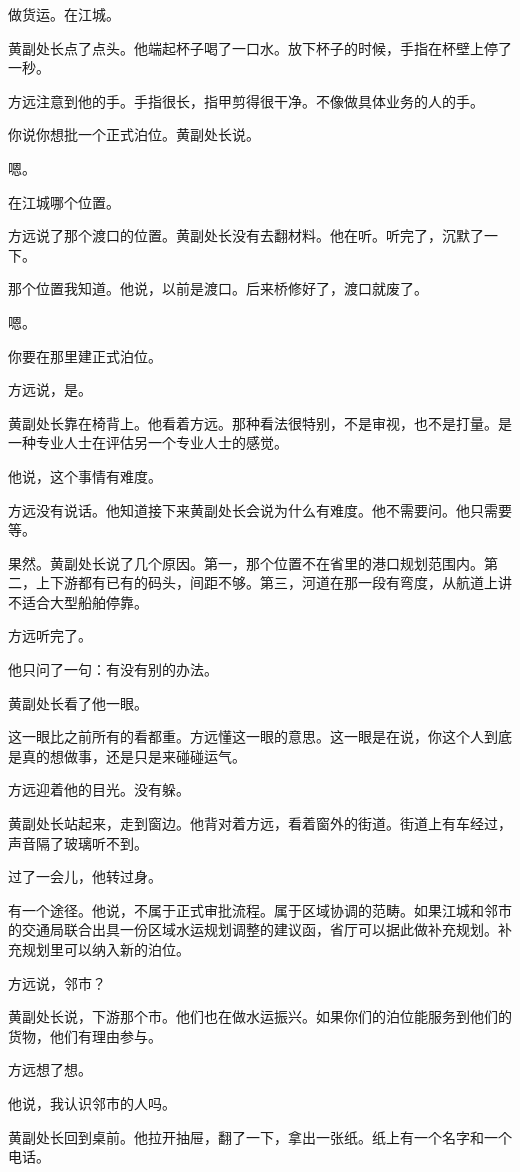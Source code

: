 \documentclass[UTF8,a5paper,11pt,openany]{ctexbook}
\begin{document}
做货运。在江城。

黄副处长点了点头。他端起杯子喝了一口水。放下杯子的时候，手指在杯壁上停了一秒。

方远注意到他的手。手指很长，指甲剪得很干净。不像做具体业务的人的手。

你说你想批一个正式泊位。黄副处长说。

嗯。

在江城哪个位置。

方远说了那个渡口的位置。黄副处长没有去翻材料。他在听。听完了，沉默了一下。

那个位置我知道。他说，以前是渡口。后来桥修好了，渡口就废了。

嗯。

你要在那里建正式泊位。

方远说，是。

黄副处长靠在椅背上。他看着方远。那种看法很特别，不是审视，也不是打量。是一种专业人士在评估另一个专业人士的感觉。

他说，这个事情有难度。

方远没有说话。他知道接下来黄副处长会说为什么有难度。他不需要问。他只需要等。

果然。黄副处长说了几个原因。第一，那个位置不在省里的港口规划范围内。第二，上下游都有已有的码头，间距不够。第三，河道在那一段有弯度，从航道上讲不适合大型船舶停靠。

方远听完了。

他只问了一句：有没有别的办法。

黄副处长看了他一眼。

这一眼比之前所有的看都重。方远懂这一眼的意思。这一眼是在说，你这个人到底是真的想做事，还是只是来碰碰运气。

方远迎着他的目光。没有躲。

黄副处长站起来，走到窗边。他背对着方远，看着窗外的街道。街道上有车经过，声音隔了玻璃听不到。

过了一会儿，他转过身。

有一个途径。他说，不属于正式审批流程。属于区域协调的范畴。如果江城和邻市的交通局联合出具一份区域水运规划调整的建议函，省厅可以据此做补充规划。补充规划里可以纳入新的泊位。

方远说，邻市？

黄副处长说，下游那个市。他们也在做水运振兴。如果你们的泊位能服务到他们的货物，他们有理由参与。

方远想了想。

他说，我认识邻市的人吗。

黄副处长回到桌前。他拉开抽屉，翻了一下，拿出一张纸。纸上有一个名字和一个电话。
\end{document}
